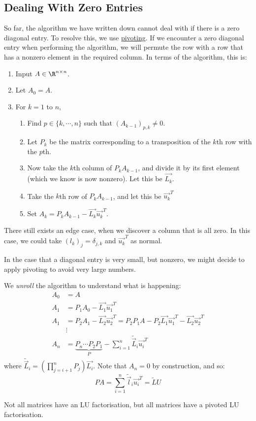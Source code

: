 \documentclass[../Main.tex]{subfiles}
\begin{document}
\subsection{Dealing With Zero Entries}
So far, the algorithm we have written down cannot deal with if there is a zero diagonal entry. To resolve this, we use \underline{pivoting}. If we encounter a zero diagonal entry when performing the algorithm, we will permute the row with a row that has a nonzero element in the required column. In terms of the algorithm, this is:
\begin{enumerate}
    \item Input $A \in \R^{n \times n}$.
    \item Let $A_0 = A$.
    \item For $k = 1$ to $n$,
    \begin{enumerate}
        \item Find $p \in \{k, \cdots, n\}$ such that $(A_{k-1})_{p, k} \neq 0$.
        \item Let $P_k$ be the matrix corresponding to a transposition of the $k$th row with the $p$th.
        \item Now take the $k$th column of $P_k A_{k-1}$, and divide it by its first element (which we know is now nonzero). Let this be $\vec{L_k}$.
        \item Take the $k$th row of $P_kA_{k-1}$, and let this be $\vec{u_k}^T$
        \item Set $A_k = P_kA_{k-1} - \vec{L_k} \vec{u_k}^T$.
    \end{enumerate}
\end{enumerate}
\begin{remarks}
    \item There still exists an edge case, when we discover a column that is all zero. In this case, we could take $(l_k)_j = \delta_{j, k}$ and $\vec{u_k}^T$ as normal.
    \item In the case that a diagonal entry is very small, but nonzero, we might decide to apply pivoting to avoid very large numbers.
\end{remarks}
We \textit{unroll} the algorithm to understand what is happening:
\begin{align*}
    A_0 &= A \\
    A_1 &= P_1 A_0 - \vec{L_1} \vec{u_1}^T \\
    A_1 &= P_2 A_1 - \vec{L_2} \vec{u_2}^T = P_2 P_1 A - P_2 \vec{L_1} \vec{u_1}^T - \vec{L_2} \vec{u_2}^T \\
    &\vdots\\
    A_n &= \underbrace{P_n \cdots P_2 P_1}_{P} - \sum_{i=1}^{n} \tilde{\vec{L}}_i \vec{u_i}^T
\end{align*}
where $\tilde{\vec{L}}_i = \left(\prod_{j=i+1}^{n} P_j\right)\vec{L_i}$. Note that $A_n = 0$ by construction, and so:
\begin{equation*}
    PA = \sum_{i=1}^{n} \tilde{\vec{l}}_i \vec{u_i}^T = \tilde{L} U
\end{equation*}
\begin{remark}
    Not all matrices have an LU factorisation, but all matrices have a pivoted LU factorisation.
\end{remark}
\end{document}
